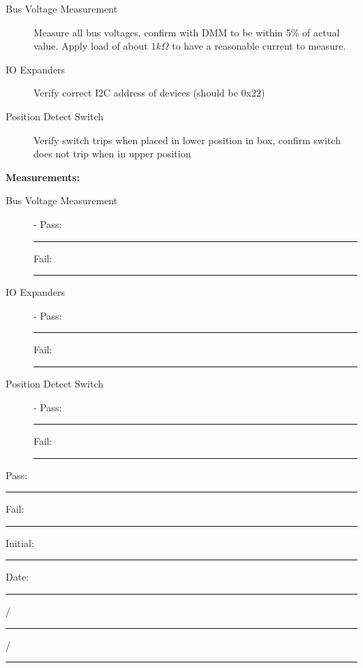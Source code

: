 \begin{description}
\item [Bus Voltage Measurement] Measure all bus voltages, confirm with DMM to be within 5\% of actual value. Apply load of about $1k\Omega$ to have a reasonable current to measure.
\item [IO Expanders] Verify correct I2C address of devices (should be 0x22)
\item [Position Detect Switch] Verify switch trips when placed in lower position in box, confirm switch does not trip when in upper position 
\end{description}



{\Large \textbf{Measurements:}}\\[5pt]
\begin{description}
\item [Bus Voltage Measurement] -  \hfill Pass: \rule{1cm}{0.15mm} \hspace{0.5cm} Fail: \rule{1cm}{0.15mm}
\item [IO Expanders] -  \hfill Pass: \rule{1cm}{0.15mm} \hspace{0.5cm} Fail: \rule{1cm}{0.15mm}
\item [Position Detect Switch] -  \hfill Pass: \rule{1cm}{0.15mm} \hspace{0.5cm} Fail: \rule{1cm}{0.15mm}
\end{description}

\vfill

{\large Pass: \rule{1cm}{0.15mm} \hspace{1cm} Fail: \rule{1cm}{0.15mm}} \hfill Initial: \rule{2cm}{0.15mm} \hspace{1cm} Date: \rule{0.5cm}{0.15mm}/\rule{0.5cm}{0.15mm}/\rule{1cm}{0.15mm}\\[5pt]